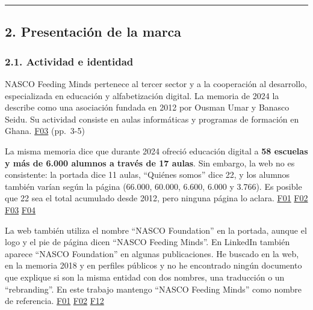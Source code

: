 \documentclass[
]{article}
\begin{document}
\begin{center}\rule{0.5\linewidth}{0.5pt}\end{center}

\hypertarget{presentaciuxf3n-de-la-marca}{%
\subsection{2. Presentación de la
marca}\label{presentaciuxf3n-de-la-marca}}

\hypertarget{actividad-e-identidad}{%
\subsubsection{2.1. Actividad e identidad}\label{actividad-e-identidad}}

NASCO Feeding Minds pertenece al tercer sector y a la cooperación al
desarrollo, especializada en educación y alfabetización digital. La
memoria de 2024 la describe como una asociación fundada en 2012 por
Ousman Umar y Banasco Seidu. Su actividad consiste en aulas informáticas
y programas de formación en Ghana.
\href{https://nascoict.org/wp-content/uploads/MEMORIA-2024.pdf}{F03}
(pp.~3-5)

La misma memoria dice que durante 2024 ofreció educación digital a
\textbf{58 escuelas y más de 6.000 alumnos a través de 17 aulas}. Sin
embargo, la web no es consistente: la portada dice 11 aulas, ``Quiénes
somos'' dice 22, y los alumnos también varían según la página (66.000,
60.000, 6.600, 6.000 y 3.766). Es posible que 22 sea el total acumulado
desde 2012, pero ninguna página lo aclara.
\href{https://nascoict.org/}{F01}
\href{https://nascoict.org/quienes-somos/}{F02}
\href{https://nascoict.org/wp-content/uploads/MEMORIA-2024.pdf}{F03}
\href{https://nascoict.org/aulas-informaticas/}{F04}

La web también utiliza el nombre ``NASCO Foundation'' en la portada,
aunque el logo y el pie de página dicen ``NASCO Feeding Minds''. En
LinkedIn también aparece ``NASCO Foundation'' en algunas publicaciones.
He buscado en la web, en la memoria 2018 y en perfiles públicos y no he
encontrado ningún documento que explique si son la misma entidad con dos
nombres, una traducción o un ``rebranding''. En este trabajo mantengo
``NASCO Feeding Minds'' como nombre de referencia.
\href{https://nascoict.org/}{F01}
\href{https://nascoict.org/quienes-somos/}{F02}
\href{https://www.linkedin.com/posts/nasco-feeding-minds_nascofoundation-educaci\%C3\%B3ndigital-impactosocial-activity-7500847528586846208-5q6E}{F12}
\end{document}

